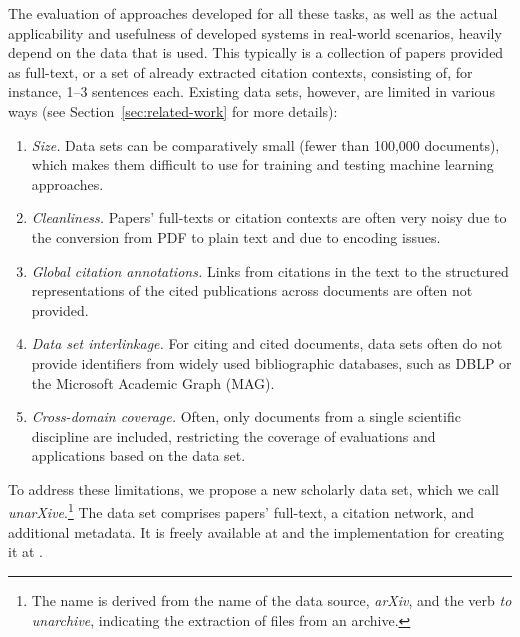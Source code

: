 The evaluation of approaches developed for all these tasks, as well as the actual applicability and usefulness of developed systems in real-world scenarios, heavily depend on the data that is used. This typically is a collection of papers provided as full-text, or a set of already extracted citation contexts, consisting of, for instance, 1--3 sentences each. Existing data sets, however, are limited in various ways (see Section~\ref{sec:related-work} for more details):

\begin{enumerate}
 \item[(1)] \textit{Size.} Data sets can be comparatively small (fewer than 100,000 documents), which makes them difficult to use for training and testing machine learning approaches.
 \item[(2)] \textit{Cleanliness.} Papers' full-texts or citation contexts are often very noisy due to the conversion from PDF to plain text and due to encoding issues.
 \item[(3)] \textit{Global citation annotations.} Links from citations in the text to the structured representations of the cited publications across documents are often not provided.
 \item[(4)] \textit{Data set interlinkage.} For citing and cited documents, data sets often do not provide identifiers from widely used bibliographic databases, such as DBLP or the Microsoft Academic Graph (MAG).
 \item[(5)] \textit{Cross-domain coverage.} Often, only documents from a single scientific discipline are included, restricting the coverage of evaluations and applications based on the data set.
\end{enumerate}

To address these limitations, we propose a new scholarly data set, which we call \emph{unarXive}.\footnote{The name is derived from the name of the data source, \textit{arXiv}, and the verb \textit{to unarchive}, indicating the extraction of files from an archive.} The data set comprises papers' full-text, a citation network, and additional metadata.
It is freely available at  and the implementation for creating it at .

